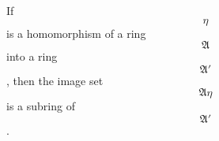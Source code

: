 If $$\eta$$ is a homomorphism of a ring $$\mathfrak{A}$$ into a ring $$\mathfrak{A}'$$, then the image set $$\mathfrak{A}\eta$$ is a subring of $$\mathfrak{A}'$$.
